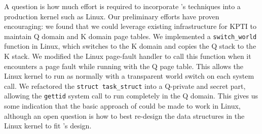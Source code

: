 A question is how much effort is required to incorporate
\sys's techniques into a production kernel such as Linux.
Our preliminary efforts have proven
encouraging: we found that we could leverage existing infrastructure
for KPTI to maintain Q domain and K domain page tables.  We implemented
a \texttt{switch\_world} function in Linux, which switches to the K
domain and copies the Q stack to the K stack.  We modified the Linux
page-fault handler to call this function when it encounters a page
fault while running with the Q page table. This allows the Linux kernel
to run as normally with a transparent world switch on each system call.
We refactored the \texttt{struct task\_struct} into a Q-private and secret
part, allowing the \texttt{gettid} system call to run completely in the
Q domain.  This gives us some indication that the basic approach of \sys
could be made to work in Linux, although an open question is how to best
re-design the data structures in the Linux kernel to fit \sys's design.
